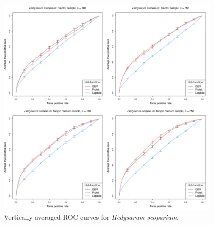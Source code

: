\begin{figure}
	\includegraphics[width=\linewidth]{plots/data-perf-species2}
	\caption{Vertically averaged ROC curves for \emph{Hedysarum scoparium}.}
	\label{rbfig:data2roc}
\end{figure}

